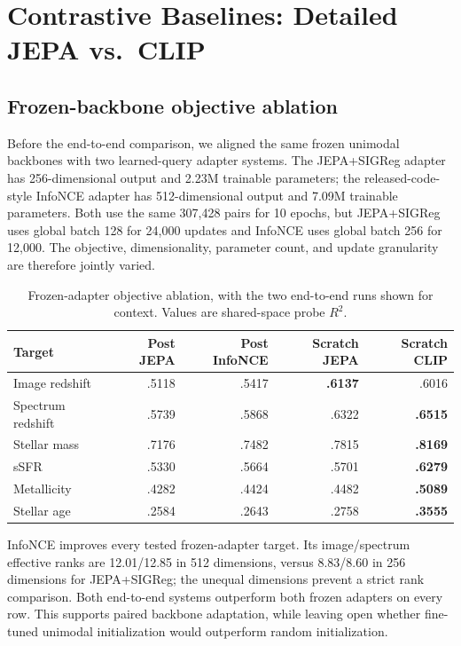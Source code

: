 \documentclass{article}
\newcommand{\rscore}{$R^2$}
\begin{document}
\FloatBarrier
\section{Contrastive Baselines: Detailed JEPA vs.\ CLIP}
\label{app:clip}

\subsection{Frozen-backbone objective ablation}

Before the end-to-end comparison, we aligned the same frozen unimodal
backbones with two learned-query adapter systems.
The JEPA+SIGReg adapter has 256-dimensional output and 2.23M trainable
parameters; the released-code-style InfoNCE adapter has 512-dimensional output
and 7.09M trainable parameters.
Both use the same 307,428 pairs for 10 epochs, but JEPA+SIGReg uses global
batch 128 for 24,000 updates and InfoNCE uses global batch 256 for 12,000.
The objective, dimensionality, parameter count, and update granularity are
therefore jointly varied.

\begin{table}[h]
\centering
\caption{Frozen-adapter objective ablation, with the two end-to-end runs shown
for context. Values are shared-space probe \rscore.}
\label{tab:frozen_infonce}
\small
\setlength{\tabcolsep}{4.0pt}
\begin{tabular}{lrrrr}
\toprule
Target & Post JEPA & Post InfoNCE & Scratch JEPA & Scratch CLIP\\
\midrule
Image redshift & .5118 & .5417 & \textbf{.6137} & .6016\\
Spectrum redshift & .5739 & .5868 & .6322 & \textbf{.6515}\\
Stellar mass & .7176 & .7482 & .7815 & \textbf{.8169}\\
sSFR & .5330 & .5664 & .5701 & \textbf{.6279}\\
Metallicity & .4282 & .4424 & .4482 & \textbf{.5089}\\
Stellar age & .2584 & .2643 & .2758 & \textbf{.3555}\\
\bottomrule
\end{tabular}
\end{table}

InfoNCE improves every tested frozen-adapter target.
Its image/spectrum effective ranks are 12.01/12.85 in 512 dimensions, versus
8.83/8.60 in 256 dimensions for JEPA+SIGReg; the unequal dimensions prevent a
strict rank comparison.
Both end-to-end systems outperform both frozen adapters on every row.
This supports paired backbone adaptation, while leaving open whether
fine-tuned unimodal initialization would outperform random initialization.
\end{document}
